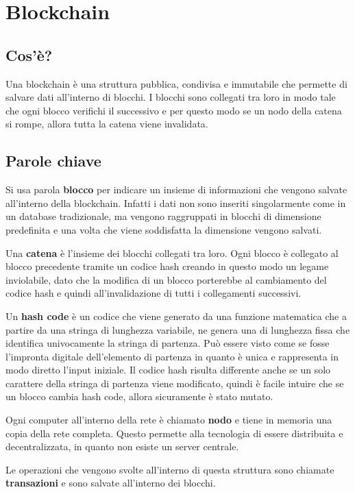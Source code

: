 \section{Blockchain}

\subsection{Cos'è?}
Una blockchain è una struttura pubblica, condivisa e immutabile che permette di
salvare dati all'interno di blocchi. I blocchi sono collegati tra loro in modo
tale che ogni blocco verifichi il successivo e per questo modo se un nodo della
catena si rompe, allora tutta la catena viene invalidata.

\subsection{Parole chiave}
Si usa parola \textbf{blocco} per indicare un insieme di informazioni che
vengono salvate all'interno della blockchain. Infatti i dati non sono inseriti
singolarmente come in un database tradizionale, ma vengono raggruppati in
blocchi di dimensione predefinita e una volta che viene soddisfatta la
dimensione vengono salvati.

Una \textbf{catena} è l'insieme dei blocchi collegati tra loro. Ogni blocco è 
collegato al blocco precedente tramite un codice hash creando in questo modo
un legame inviolabile, dato che la modifica di un blocco porterebbe al 
cambiamento del codice hash e quindi all'invalidazione di tutti i collegamenti
successivi.

Un \textbf{hash code} è un codice che viene generato da una funzione matematica
che a partire da una stringa di lunghezza variabile, ne genera una di lunghezza
fissa che identifica univocamente la stringa di partenza. Può essere visto come
se fosse l'impronta digitale dell'elemento di partenza in quanto è unica e 
rappresenta in modo diretto l'input iniziale. Il codice hash risulta differente
anche se un solo carattere della stringa di partenza viene modificato, quindi è 
facile intuire che se un blocco cambia hash code, allora sicuramente è stato
mutato.

Ogni computer all'interno della rete è chiamato \textbf{nodo} e tiene in 
memoria una copia della rete completa. Questo permette alla tecnologia di 
essere distribuita e decentralizzata, in quanto non esiste un server centrale.

Le operazioni che vengono svolte all'interno di questa struttura sono chiamate
\textbf{transazioni} e sono salvate all'interno dei blocchi.

